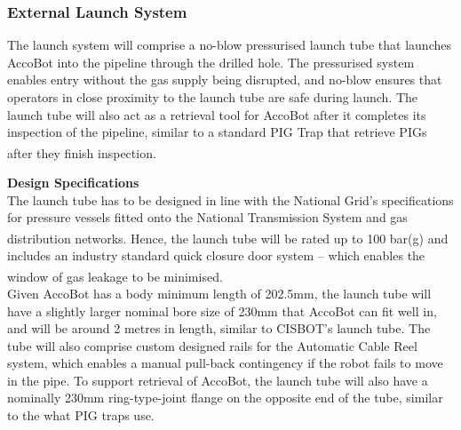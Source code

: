 \documentclass[11pt]{article}		%
\newcommand{\supercite}[1]{\textsuperscript{\cite{#1}}}		%
\begin{document}
		\subsubsection{External Launch System}
		    
            The launch system will comprise a no-blow pressurised launch tube that launches AccoBot into the pipeline through the drilled hole. The pressurised system enables entry without the gas supply being disrupted, and no-blow ensures that operators in close proximity to the launch tube are safe during launch. The launch tube will also act as a retrieval tool for AccoBot after it completes its inspection of the pipeline, similar to a standard PIG Trap that retrieve PIGs after they finish inspection\supercite{pigTrap}. 

            \textbf{Design Specifications}
            \\
            \hspace*{3ex}The launch tube has to be designed in line with the National Grid’s specifications for pressure vessels fitted onto the National Transmission System and gas distribution networks\supercite{NTSstandards}. Hence, the launch tube will be rated up to 100 bar(g) and includes an industry standard quick closure door system – which enables the window of gas leakage to be minimised\supercite{launchtubestandards}.
            \\
            \hspace*{3ex}Given AccoBot has a body minimum length of 202.5mm, the launch tube will have a slightly larger nominal bore size of 230mm that AccoBot can fit well in, and will be around 2 metres in length, similar to CISBOT’s launch tube. The tube will also comprise custom designed rails for the Automatic Cable Reel system, which enables a manual pull-back contingency if the robot fails to move in the pipe. To support retrieval of AccoBot, the launch tube will also have a nominally 230mm ring-type-joint flange on the opposite end of the tube, similar to the what PIG traps use. 
\end{document}
